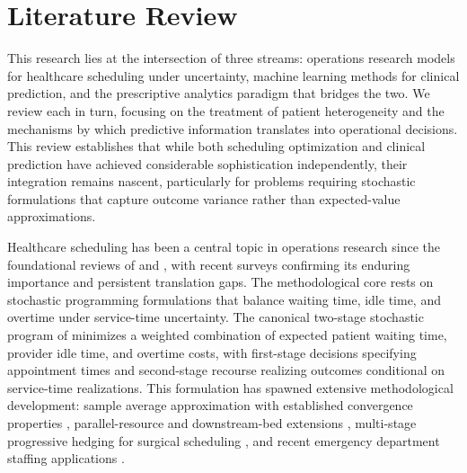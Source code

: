 \documentclass[11pt,a4paper]{article}
\begin{document}
\section{Literature Review}

This research lies at the intersection of three streams: operations research models for healthcare scheduling under uncertainty, machine learning methods for clinical prediction, and the prescriptive analytics paradigm that bridges the two. We review each in turn, focusing on the treatment of patient heterogeneity and the mechanisms by which predictive information translates into operational decisions. This review establishes that while both scheduling optimization and clinical prediction have achieved considerable sophistication independently, their integration remains nascent, particularly for problems requiring stochastic formulations that capture outcome variance rather than expected-value approximations.


Healthcare scheduling has been a central topic in operations research since the foundational reviews of \citet{cayirli2003outpatient} and \citet{gupta2008appointment}, with recent surveys \citep{youn2022planning, belien2025fifty} confirming its enduring importance and persistent translation gaps. The methodological core rests on stochastic programming formulations that balance waiting time, idle time, and overtime under service-time uncertainty. The canonical two-stage stochastic program of \citet{denton2003sequential} minimizes a weighted combination of expected patient waiting time, provider idle time, and overtime costs, with first-stage decisions specifying appointment times and second-stage recourse realizing outcomes conditional on service-time realizations. This formulation has spawned extensive methodological development: sample average approximation with established convergence properties \citep{kleywegt2002sample, mancilla2012sample}, parallel-resource and downstream-bed extensions \citep{denton2010optimal}, multi-stage progressive hedging for surgical scheduling \citep{gul2015progressive}, and recent emergency department staffing applications \citep{marchesi2025stochastic}.
\end{document}
